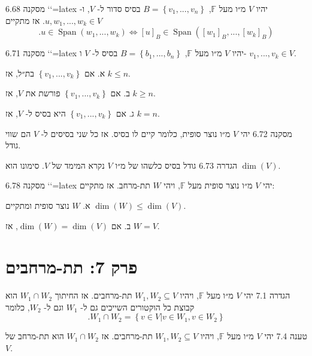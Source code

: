 \documentclass[a4paper, 11pt]{article}
\newcommand{\Set}[1]{\left\{#1\right\}}
\begin{document}
\begin{envbox}[thmcolor]{מסקנה 6.68}
`\label{cor:span-coordinates}`{=latex} יהיו $V$ מ״ו מעל $\mathbb{F}$, $B=\Set{v_1,...,v_n}$ בסיס סדור ל- $V$, ו- $u,w_1,...,w_k\in V$. אז מתקיים 
\[
.u\in\mathop{\mathrm{Span}}(w_1,...,w_k) \iff [u]_B\in\mathop{\mathrm{Span}}([w_1]_B,...,[w_k]_B)
\]
\end{envbox}

\begin{envbox}[thmcolor]{מסקנה 6.71}
`\label{cor:size-dim2}`{=latex} יהיו $V$ מ״ו מעל $\mathbb{F}$, $B=\Set{b_1,...,b_n}$ בסיס ל- $V$ ו- $v_1,...,v_k\in V$.

א. אם $\Set{v_1,...,v_k}$ בת״ל, אז $k\leq n$.

ב. אם $\Set{v_1,...,v_k}$ פורשת את $V$, אז $k\geq n$.

ג. אם $\Set{v_1,...,v_k}$ היא בסיס ל- $V$, אז $k=n$.
\end{envbox}

\begin{envbox}[thmcolor]{מסקנה 6.72}
יהי $V$ מ״ו נוצר סופית, כלומר קיים לו בסיס. אז כל שני בסיסים ל- $V$ הם שווי גודל.
\end{envbox}

\begin{envbox}[defcolor]{הגדרה 6.73}
גודל בסיס כלשהו של מ״ו $V$ נקרא המימד של $V$. סימונו הוא $\dim(V)$.
\end{envbox}

\begin{envbox}[thmcolor]{מסקנה 6.78}
`\label{cor:subspace-dim}`{=latex} יהי $V$ מ״ו נוצר סופית מעל $\mathbb{F}$, ויהי $W$ תת-מרחב. אז מתקיים:

א. $W$ נוצר סופית ומתקיים $\dim(W)\leq \dim(V)$.

ב. אם $\dim(W)=\dim(V)$, אז $W=V$.
\end{envbox}

\newpage

\section{פרק 7: תת-מרחבים}

\begin{envbox}[defcolor]{הגדרה 7.1}
יהי $V$ מ״ו מעל $\mathbb{F}$, ויהיו $W_1,W_2\subseteq V$ תת-מרחבים. אז החיתוך $W_1\cap W_2$ הוא קבוצת כל הוקטורים השייכים גם ל- $W_1$ וגם ל- $W_2$, כלומר 
\[
.W_1\cap W_2=\Set{v\in V|v\in W_1,v\in W_2}
\]
\end{envbox}

\begin{envbox}[thmcolor]{טענה 7.4}
יהי $V$ מ״ו מעל $\mathbb{F}$, ויהיו $W_1,W_2\subseteq V$ תת-מרחבים. אז $W_1\cap W_2$ הוא תת-מרחב של $V$.
\end{envbox}
\end{document}
